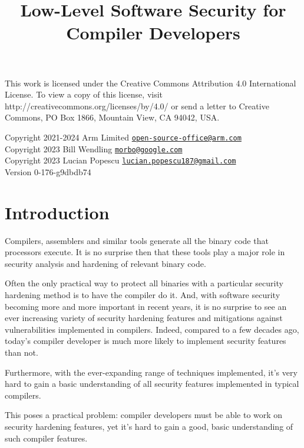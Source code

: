 \documentclass[
  a4paper,
]{report}
\title{Low-Level Software Security for Compiler Developers}
\author{}
\date{}
\begin{document}
\maketitle

\clearpage

\vspace*{\fill}
This work is licensed under the Creative Commons Attribution 4.0 International
License. To view a copy of this license, visit
http://creativecommons.org/licenses/by/4.0/ or send a letter to Creative
Commons, PO Box 1866, Mountain View, CA 94042, USA.

  Copyright 2021-2024 Arm Limited
\href{mailto:open-source-office@arm.com}{\nolinkurl{open-source-office@arm.com}}\\
  Copyright 2023 Bill Wendling
\href{mailto:morbo@google.com}{\nolinkurl{morbo@google.com}}\\
  Copyright 2023 Lucian Popescu
\href{mailto:lucian.popescu187@gmail.com}{\nolinkurl{lucian.popescu187@gmail.com}}\\

Version 0-176-g9dbdb74
\clearpage

{
\hypersetup{linkcolor=}
\setcounter{tocdepth}{2}
\tableofcontents
}
\hypertarget{introduction}{%
\chapter{Introduction}\label{introduction}}

Compilers, assemblers and similar tools generate all the binary code
that processors execute. It is no surprise then that these tools play a
major role in security analysis and hardening of relevant binary code.

Often the only practical way to protect all binaries with a particular
security hardening method is to have the compiler do it. And, with
software security becoming more and more important in recent years, it
is no surprise to see an ever increasing variety of security hardening
features and mitigations against vulnerabilities implemented in
compilers. Indeed, compared to a few decades ago, today's compiler
developer is much more likely to implement security features than not.

Furthermore, with the ever-expanding range of techniques implemented,
it's very hard to gain a basic understanding of all security features
implemented in typical compilers.

This poses a practical problem: compiler developers must be able to work
on security hardening features, yet it's hard to gain a good, basic
understanding of such compiler features.
\end{document}
